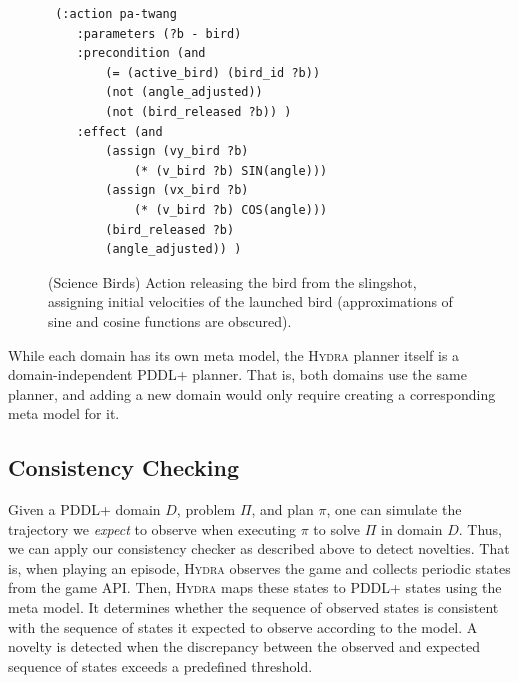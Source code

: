 \documentclass[sigconf]{aamas}
\newcommand{\sbirds}{Science Birds\xspace} %
\newcommand{\hydra}{\textsc{Hydra}\xspace} %
\begin{document}
\begin{figure}
\begin{center}
    \fontsize{8pt}{10pt}\selectfont
\begin{verbatim}
 (:action pa-twang
    :parameters (?b - bird)
    :precondition (and
        (= (active_bird) (bird_id ?b))
        (not (angle_adjusted))
        (not (bird_released ?b)) )
    :effect (and
        (assign (vy_bird ?b) 
            (* (v_bird ?b) SIN(angle)))
        (assign (vx_bird ?b) 
            (* (v_bird ?b) COS(angle)))
        (bird_released ?b)
        (angle_adjusted)) )
\end{verbatim}
\caption{(Science Birds) Action releasing the bird from the slingshot, assigning initial velocities of the launched bird (approximations of sine and cosine functions are obscured).}
\label{fig:action-pa-twang}
\end{center}
\end{figure}

While each domain has its own meta model, the \hydra planner itself is a domain-independent PDDL+ planner. 
That is, both domains use the same planner, and adding a new domain would only require creating a corresponding meta model for it. 









\subsection{Consistency Checking}

Given a PDDL+ domain $D$, problem $\Pi$, and plan $\pi$, one can simulate the trajectory we \emph{expect} to observe when executing $\pi$ to solve $\Pi$ in domain $D$. 
Thus, we can apply our consistency checker as described above to detect novelties. 
That is, when playing an episode, \hydra observes the game and collects periodic states from the game API. 
Then, \hydra maps these states to PDDL+ states using the meta model. 
It determines whether the sequence of observed states is consistent with the sequence of states it expected to observe according to the model. 
A novelty is detected when the discrepancy between the observed and expected sequence of states exceeds a predefined threshold. 
\end{document}
